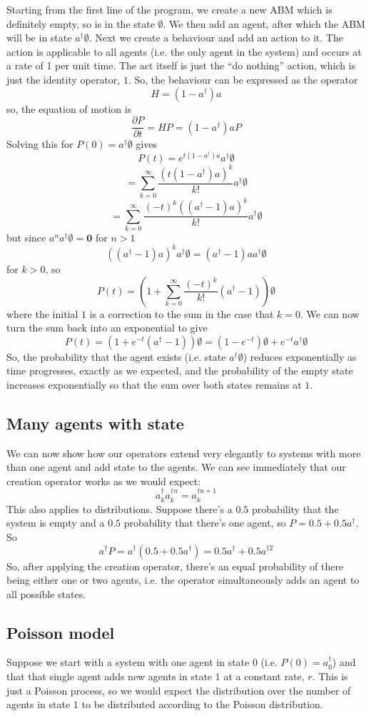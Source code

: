 \documentclass[letterpaper,twocolumn,10pt]{article}
\begin{document}
Starting from the first line of the program, we create a new ABM which is definitely empty, so is in the state $\emptyset$. We then add an agent, after which the ABM will be in state $a^\dag \emptyset$. Next we create a behaviour and add an action to it. The action is applicable to all agents (i.e. the only agent in the system) and occurs at a rate of 1 per unit time. The act itself is just the ``do nothing'' action, which is just the identity operator, $1$. So, the behaviour can be expressed as the operator
\[
H = (1 - a^\dag)a
\]
so, the equation of motion is
\[
\frac{\partial P}{\partial t} = HP = (1 - a^\dag )aP
\]
Solving this for $P(0) = a^\dag\emptyset$ gives
\[
P(t) = e^{t(1-a^\dag)a}a^\dag\emptyset
\]
\[
 = \sum_{k=0}^\infty \frac{\left(t(1-a^\dag)a\right)^k}{k!}a^\dag\emptyset
\]
\[
= \sum_{k=0}^\infty \frac{(-t)^k\left((a^\dag-1)a\right)^k}{k!}a^\dag\emptyset
\]
but since $a^na^\dag\emptyset = \mathbf{0}$ for $n>1$
\[
\left((a^\dag-1)a\right)^ka^\dag\emptyset = (a^\dag-1)aa^\dag\emptyset
\]
for $k>0$, so
\[
P(t) = \left(1 + \sum_{k=0}^\infty \frac{(-t)^k}{k!}(a^\dag-1)\right)\emptyset
\]
where the initial $1$ is a correction to the sum in the case that $k=0$. We can now turn the sum back into an exponential to give
\[
P(t) = (1 + e^{-t}(a^\dag -1))\emptyset =  (1 - e^{-t})\emptyset + e^{-t}a^\dag\emptyset
\]
So, the probability that the agent exists (i.e. state $a^\dag\emptyset$) reduces exponentially as time progresses, exactly as we expected, and the probability of the empty state increases exponentially so that the sum over both states remains at $1$.

\subsection{Many agents with state}

We can now show how our operators extend very elegantly to systems with more than one agent and add state to the agents. 
We can see immediately that our creation operator works as we would expect:
\[
a_k^\dag a_k^{\dag n} = a_k^{\dag n+1}
\]
This also applies to distributions. Suppose there's a $0.5$ probability that the system is empty and a $0.5$ probability that there's one agent, so $P = 0.5 + 0.5a^\dag$. So
\[
a^\dag P = a^\dag (0.5 + 0.5a^\dag) = 0.5a^\dag + 0.5a^{\dag 2}
\]
So, after applying the creation operator, there's an equal probability of there being either one or two agents, i.e. the operator simultaneously adds an agent to all possible states.

\subsection{Poisson model}
Suppose we start with a system with one agent in state 0 (i.e. $P(0) = a_0^\dag$) and that that single agent adds new agents in state $1$ at a constant rate, $r$. This is just a Poisson process, so we would expect the distribution over the number of agents in state $1$ to be distributed according to the Poisson distribution.
\end{document}
